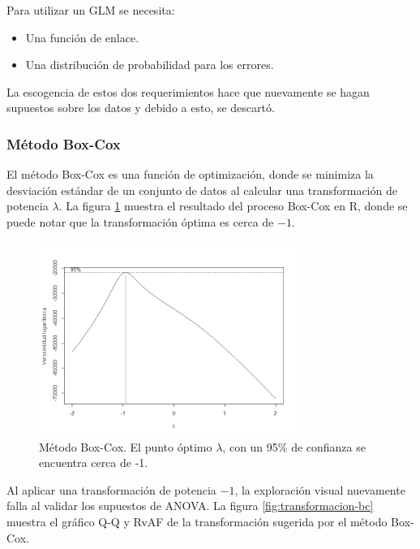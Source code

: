 Para utilizar un GLM se necesita:
\begin{itemize}
    \item Una función de enlace.
    \item Una distribución de probabilidad para los errores.
\end{itemize}

La escogencia de estos dos requerimientos hace que nuevamente se hagan supuestos sobre los datos y debido a esto, se descartó.


\subsubsection{Método Box-Cox}

El método Box-Cox\cite{Sakia1992} es una función de optimización, donde se minimiza la desviación estándar de un conjunto de datos al calcular una transformación de potencia $\lambda$.
La figura \ref{fig:box-cox} muestra el resultado del proceso Box-Cox en R, donde se puede notar que la transformación óptima es cerca de $-1$.


\begin{figure}[H]
    \centering
    \includegraphics[width=0.75\textwidth]{images/t/box-cox.png}
    \caption{Método Box-Cox. El punto óptimo $\lambda$, con un 95\% de confianza se encuentra cerca de -1.}
    \label{fig:box-cox}
\end{figure}


Al aplicar una transformación de potencia $-1$, la exploración visual nuevamente falla al validar los supuestos de ANOVA. La figura \ref{fig:transformacion-bc} muestra el gráfico Q-Q y RvAF de la transformación sugerida por el método Box-Cox.

